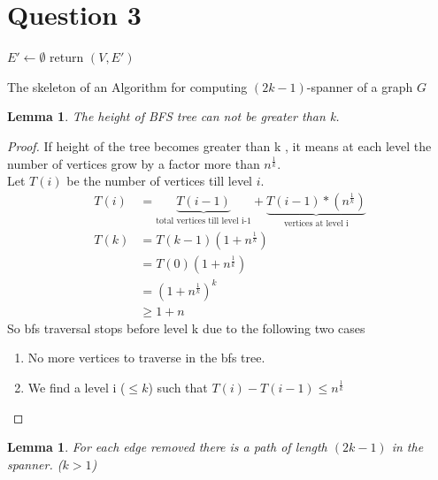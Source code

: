 \documentclass[11pt]{article}
\newtheorem{lemma}[theorem]{Lemma}
\begin{document}
\pagebreak
\section*{Question 3}
\begin{algorithm}[h]
$E'\leftarrow \emptyset$\;
return $(V,E')$\;
\caption{The skeleton of an Algorithm for computing $(2k-1)$-spanner of a graph $G$}
\label{skeleton}
\end{algorithm}
\begin{lemma}
The height of BFS tree can not be greater than  k.
\end{lemma}
\begin{proof}
If height of the tree becomes greater than k , it means at each level the number of vertices grow by a factor more than $n^{\frac{1}{k}}$. \\ 
Let $T(i)$ be the number of vertices till level $i$.
\begin{align*}
T(i) &= \underbrace{T(i-1)}_{\text{total vertices till level i-1}} + \underbrace{T(i-1)*(n^{\frac{1}{k}})}_{\text{vertices at level i}} \\
T(k) &= T(k-1) (1 + n^{\frac{1}{k}}) \\
	&= T(0) (1 + n^{\frac{1}{k}}) \\
	&= (1 + n^{\frac{1}{k}})^{k} \\
	&\geq 1 + n 
\end{align*}
So bfs traversal stops before level k due to the following two cases
\begin{enumerate}
\item No more vertices to traverse in the bfs tree. 
\item We find a level i ($\leq k$) such that $T(i) - T(i-1) \leq n^\frac{1}{k}$ 
\end{enumerate}
\end{proof}
\begin{lemma}
For each edge removed there is a path of length $(2k-1)$ in the spanner. ($k>1$)
\end{lemma}
\end{document}

